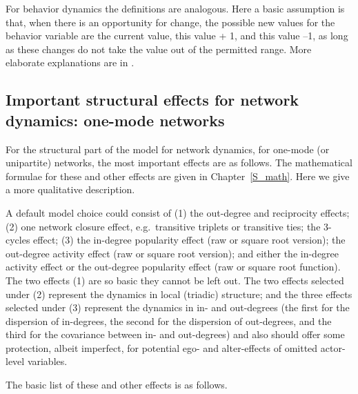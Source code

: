 \documentclass[a4paper,fleqn,11pt]{article}
\newcommand{\+}{\, + \,}
\begin{document}
{For behavior dynamics the definitions are analogous.
Here a basic assumption is that, when there is an opportunity for change,
the possible new values for the behavior variable are the current
value, this value + 1, and this value --1, as long as these changes
do not take the value out of the permitted range.
More elaborate explanations are in
\citep*{SnijdersEA07, SnijdersEA10b, SteglichEA10}.

\subsection{Important structural effects for network dynamics:
           \protect\newline one-mode networks}
\label{S_imp_str1}

For the structural part of the model for network dynamics,
for one-mode (or unipartite) networks,
the most important effects are as follows.
The mathematical formulae for these and other effects are given
in Chapter~\ref{S_math}. Here we give a more qualitative description.

A default model choice could consist of (1) the out-degree and reciprocity
effects; (2) one network closure effect,
e.g.\ transitive triplets or transitive ties; the 3-cycles effect;
(3) the in-degree popularity effect (raw or square root version);
the out-degree activity effect (raw or square root version);
and either the in-degree activity effect or the out-degree popularity effect
(raw or square root function).
The two effects (1) are so basic they cannot be left out.
The two effects selected under (2) represent the dynamics in local (triadic) structure;
and the three effects selected under (3) represent the dynamics
in in- and out-degrees (the first for the dispersion of in-degrees,
the second for the dispersion of out-degrees, and the third for the
covariance between in- and out-degrees) and also should offer
some protection, albeit imperfect, for potential ego- and alter-effects
of omitted actor-level variables.

The basic list of these and other effects is as follows.

}
\end{document}
